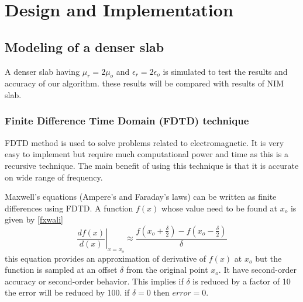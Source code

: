 
\chapter{Design and Implementation} %

\label{Chapter2} %

\fancyhead[RO]{\thepage}
\fancyhead[RE]{\thepage}
\fancyhead[LO]{\emph{\ttitle}}

\section{Modeling of a denser slab}

A denser slab having $\mu_r = 2\mu_o$ and $\epsilon_r = 2\epsilon_o$
is simulated to test the results and accuracy of our algorithm. these results will be compared with
results of NIM slab.

\subsection{Finite Difference Time Domain (FDTD) technique}
FDTD method is used to solve problems related to electromagnetic. It is very easy to implement but require much computational power and time as this is a recursive technique. The main benefit of using this technique is that it is accurate on wide range of frequency. 

Maxwell's equations (Ampere's and Faraday's laws) can be written as finite differences using FDTD. A function $f(x)$ whose value need to be found at $x_o$ is given by \eqref{fxwali}
	\begin{equation}
	\left. \frac {df(x)}{d(x)}\right|_{x=x_o} \approx 
	\frac {f \left( x_o + \frac{\delta}{2} \right) - f \left( x_o - \frac{\delta}{2} \right) }{\delta}
	\label{fxwali}
	\end{equation}
this equation provides an approximation of derivative of $f(x)$ at $x_o$ but the function is sampled at an offset $\delta$ from the original point $x_o$. It have second-order accuracy or second-order behavior. This implies if $\delta$ is reduced by a factor of 10 the error will be reduced by 100. if $\delta = 0$ then $error = 0$.
